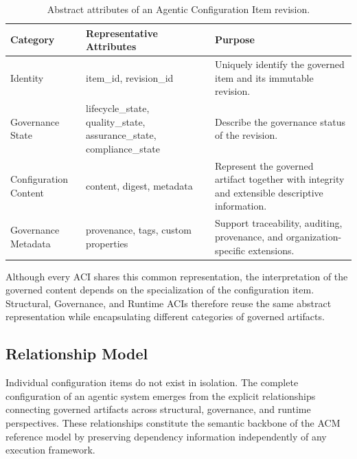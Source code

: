 \documentclass[10pt]{article}
\begin{document}
\begin{table}[t]
\centering
\caption{Abstract attributes of an Agentic Configuration Item revision.}
\label{tab:aci_attributes}

\renewcommand{\arraystretch}{1.15}

\begin{tabular}{p{3.3cm}p{3.4cm}p{8.3cm}}

\toprule

\textbf{Category} &
\textbf{Representative Attributes} &
\textbf{Purpose}

\\
\midrule

Identity &
item\_id, revision\_id &
Uniquely identify the governed item and its immutable revision.

\\

Governance State &
lifecycle\_state, quality\_state, assurance\_state, compliance\_state &
Describe the governance status of the revision.

\\

Configuration Content &
content, digest, metadata &
Represent the governed artifact together with integrity and extensible descriptive information.

\\

Governance Metadata &
provenance, tags, custom properties &
Support traceability, auditing, provenance, and organization-specific extensions.

\\

\bottomrule

\end{tabular}

\end{table}

Although every ACI shares this common representation, the interpretation of the governed content depends on the specialization of the configuration item. Structural, Governance, and Runtime ACIs therefore reuse the same abstract representation while encapsulating different categories of governed artifacts.

\subsection{Relationship Model}
\label{sec:configuration_relationships}

Individual configuration items do not exist in isolation. The complete configuration of an agentic system emerges from the explicit relationships connecting governed artifacts across structural, governance, and runtime perspectives. These relationships constitute the semantic backbone of the ACM reference model by preserving dependency information independently of any execution framework.
\end{document}
